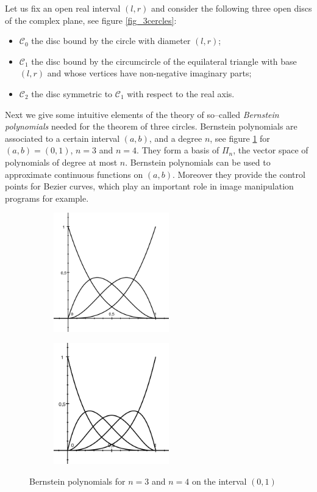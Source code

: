 \documentclass[11pt, a4paper]{article}
\newcommand{\ssc}{{\mathcal C}}
\begin{document}
Let us fix an open real interval $(l,r)$ and consider the following three open discs of the complex plane, see figure \ref{fig_3cercles}:
\begin{itemize}
 \item $\ssc_0$ the disc bound by the circle with diameter $(l,r)$;
 \item $\ssc_1$ the disc bound by the circumcircle of the equilateral triangle with base $(l,r)$ and whose vertices have non-negative imaginary parts;
 \item $\ssc_2$ the disc symmetric to $\ssc_1$ with respect to the real axis.
\end{itemize}

Next we give some intuitive elements of the theory of so--called {\em Bernstein polynomials} needed for the theorem of three circles. Bernstein polynomials are associated to a certain interval $(a,b)$, and a degree $n$, see figure \ref{fig_bern} for $(a,b) = (0,1)$, $n=3$ and $n=4$. They form a basis of $\Pi_n$, the vector space of polynomials of degree at most $n$. Bernstein polynomials can be used to approximate continuous functions on $(a,b)$. Moreover they provide the control points for Bezier curves, which play an important role in image manipulation programs for example.

\begin{figure}[htb!]
 \centering
  \begin{subfigure}
    \centering
    \includegraphics[width=5cm]{bernstein3.png}
  \end{subfigure}
  \begin{subfigure}
    \centering
    \includegraphics[width=5cm]{bernstein4.png}
  \end{subfigure}
  \caption{Bernstein polynomials for $n=3$ and $n=4$ on the interval $(0,1)$}
  \label{fig_bern}
\end{figure}
\end{document}
